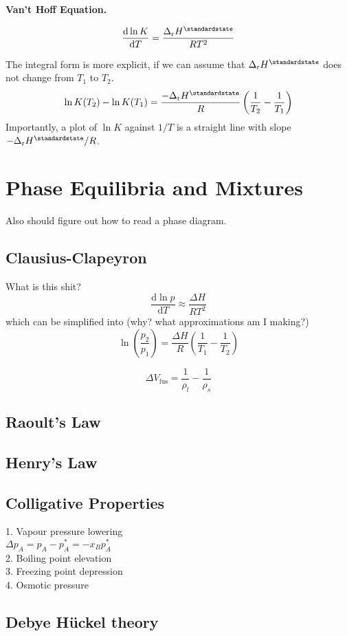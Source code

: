 \textbf{Van't Hoff Equation.}

\begin{equation*}
    \odv{\ln K}{T} = \frac{\Delta_{\mathrm{r}}H^\standardstate}{RT^2}
\end{equation*}

The integral form is more explicit, if we can assume that $\Delta_{\mathrm{r}}H^\standardstate$ does not change from $T_1$ to $T_2$.
\begin{equation*}
    \ln K (T_2) - \ln K (T_1) = \frac{-\Delta_{\mathrm{r}}H^\standardstate}{R} \left(\frac{1}{T_2} - \frac{1}{T_1}\right)
\end{equation*}
Importantly, a plot of $\ln K$ against $1/T$ is a straight line with slope $-\Delta_{\mathrm{r}}H^\standardstate / R$.

\section{Phase Equilibria and Mixtures}

Also should figure out how to read a phase diagram.

\subsection*{Clausius-Clapeyron}
What is this shit?
\begin{equation*}
    \frac{\mathrm{d}\ln p}{\mathrm{d}T} \approx \frac{\Delta H}{RT^2}
\end{equation*}
which can be simplified into (why? what approximations am I making?)
\begin{equation*}
    \ln\left(\frac{p_2}{p_1}\right) = \frac{\Delta H}{R}\left(\frac{1}{T_1} - \frac{1}{T_2}\right)
\end{equation*}

\begin{equation*}
    \Delta V_{\mathrm{fus}} = \frac{1}{\rho_l} - \frac{1}{\rho_s}
\end{equation*}

\subsection*{Raoult's Law}

\subsection*{Henry's Law}

\subsection*{Colligative Properties}
1. Vapour pressure lowering \\
$\Delta p_A = p_A - p^{*}_{A} = -x_B p^*_A$ \\
2. Boiling point elevation \\
3. Freezing point depression \\
4. Osmotic pressure \\

\subsection*{Debye H\"uckel theory}



 